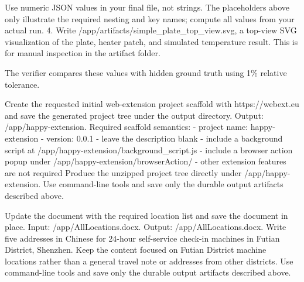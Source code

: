 \documentclass{llmxive}
\begin{document}
\begin{instructionbox}
Use numeric JSON values in your final file, not strings. The placeholders above only illustrate the required nesting and key names; compute all values from your actual run.
4. Write \textasciigrave{}/app/artifacts/simple\_plate\_top\_view.svg\textasciigrave{}, a top-view SVG visualization of the plate, heater patch, and simulated temperature result. This is for manual inspection in the artifact folder.

The verifier compares these values with hidden ground truth using 1\% relative tolerance.
\end{instructionbox}

\begin{instructionbox}
Create the requested initial web-extension project scaffold with https://webext.eu and save the generated project tree under the output directory.
Output: \textasciigrave{}/app/happy-extension\textasciigrave{}.
Required scaffold semantics:
- project name: \textasciigrave{}happy-extension\textasciigrave{}
- version: \textasciigrave{}0.0.1\textasciigrave{}
- leave the description blank
- include a background script at \textasciigrave{}/app/happy-extension/background\_script.js\textasciigrave{}
- include a browser action popup under \textasciigrave{}/app/happy-extension/browserAction/\textasciigrave{}
- other extension features are not required
Produce the unzipped project tree directly under \textasciigrave{}/app/happy-extension\textasciigrave{}.
Use command-line tools and save only the durable output artifacts described above.
\end{instructionbox}

\begin{instructionbox}
Update the document with the required location list and save the document in place.
Input: \textasciigrave{}/app/AllLocations.docx\textasciigrave{}.
Output: \textasciigrave{}/app/AllLocations.docx\textasciigrave{}.
Write five addresses in Chinese for 24-hour self-service check-in machines in Futian District, Shenzhen. Keep the content focused on Futian District machine locations rather than a general travel note or addresses from other districts.
Use command-line tools and save only the durable output artifacts described above.
\end{instructionbox}
\end{document}
